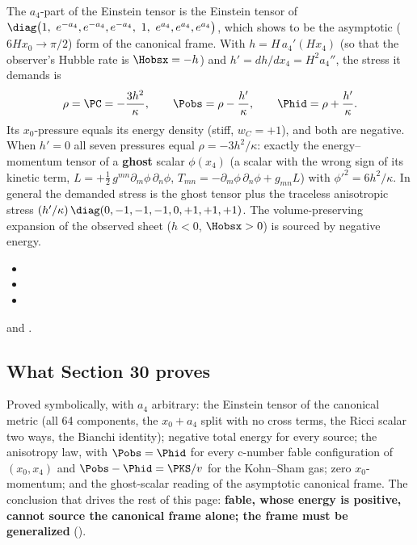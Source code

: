 The $a_4$-part of the Einstein tensor is the Einstein tensor of
$\diag\bigl(1,\ e^{-a_4},e^{-a_4},e^{-a_4},\ 1,\ e^{a_4},e^{a_4},e^{a_4}\bigr)$, which  shows to be the
asymptotic ($6Hx_0\to\pi/2$) form of the canonical frame. With $h=H\,a_4'(Hx_4)$ (so that the observer's
Hubble rate is $\Hobsx=-h$) and $h'=dh/dx_4=H^2a_4''$, the stress it demands is
\[
  \rho=\PC=-\frac{3h^2}{\kappa},\qquad \Pobs=\rho-\frac{h'}{\kappa},\qquad \Phid=\rho+\frac{h'}{\kappa} .
\]
Its $x_0$-pressure equals its energy density (stiff, $w_C=+1$), and both are negative. When $h'=0$ all
seven pressures equal $\rho=-3h^2/\kappa$: exactly the energy--momentum tensor of a \textbf{ghost}
scalar $\phi(x_4)$ (a scalar with the wrong sign of its kinetic term,
$L=+\tfrac12\,g^{mn}\partial_m\phi\,\partial_n\phi$, $T_{mn}=-\partial_m\phi\,\partial_n\phi+g_{mn}L$) with
$\phi'^2=6h^2/\kappa$. In general the demanded stress is the ghost tensor plus the traceless anisotropic
stress $(h'/\kappa)\,\diag(0,-1,-1,-1,0,+1,+1,+1)$. The volume-preserving expansion of the observed
sheet ($h<0$, $\Hobsx>0$) is sourced by negative energy. 
\begin{itemize}
  \item {}
  \item {}
  \item {}
\end{itemize}
and .

\subsection{What Section 30 proves}
\label{sec:4.9}

Proved symbolically, with $a_4$ arbitrary: the Einstein tensor of the canonical metric (all 64
components, the $x_0+a_4$ split with no cross terms, the Ricci scalar two ways, the Bianchi identity);
negative total energy for every source; the anisotropy law, with $\Pobs=\Phid$ for every c-number fable
configuration of $(x_0,x_4)$ and $\Pobs-\Phid=\PKS/v$ for the Kohn--Sham gas; zero $x_0$-momentum; and the
ghost-scalar reading of the asymptotic canonical frame. The conclusion that drives the rest of this
page: \textbf{fable, whose energy is positive, cannot source the canonical frame alone; the frame must be
generalized} ().

